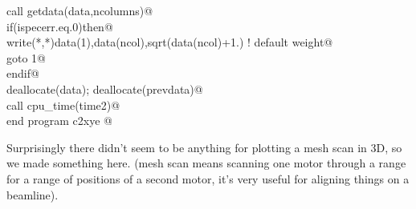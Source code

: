 \documentclass[10pt,a4paper,notitlepage]{article}
\begin{document}
\begin{flushleft}
\begin{minipage}{\linewidth}
\begin{list}{}{}
\mbox{}\verb@      call getdata(data,ncolumns)@\\
\mbox{}\verb@      if(ispecerr.eq.0)then@\\
\mbox{}\verb@         write(*,*)data(1),data(ncol),sqrt(data(ncol)+1.) ! default weight@\\
\mbox{}\verb@         goto 1@\\
\mbox{}\verb@      endif@\\
\mbox{}\verb@      deallocate(data); deallocate(prevdata)@\\
\mbox{}\verb@      call cpu_time(time2)@\\
\mbox{}   end program c2xye                                                   @{\NWsep}
\end{list}
\vspace{-1.5ex}
\footnotesize
\begin{list}{}{\setlength{\itemsep}{-\parsep}\setlength{\itemindent}{-\leftmargin}}

\item{}
\end{list}
\end{minipage}\vspace{4ex}
\end{flushleft}
Surprisingly there didn't seem to be anything for plotting a mesh scan in
3D, so we made something here. (mesh scan means scanning one motor through a 
range for a range of positions of a second motor, it's very useful for aligning
things on a beamline). 
\end{document}
